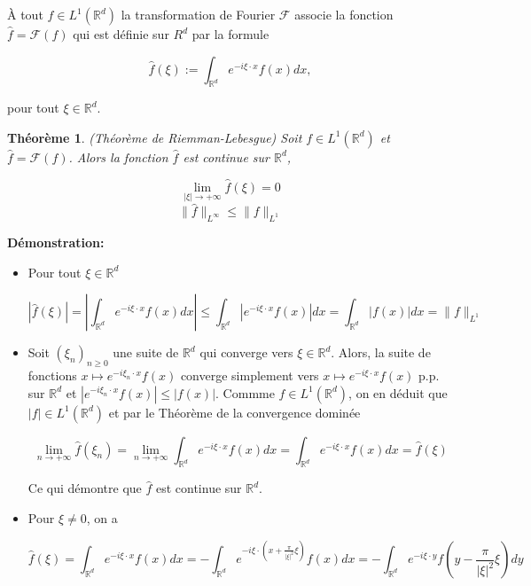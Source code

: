 \documentclass[10pt,a4paper,oneside]{article}
\newtheorem{theoreme}{Théorème}
\newenvironment{definition}[1][Definition]{\begin{trivlist}
\item[\hskip \labelsep {\bfseries #1}]}{\end{trivlist}}
\begin{document}
\begin{itemize}

\item
\begin{definition}
À tout $f \in L^1(\mathbb{R}^d)$ la transformation de Fourier $\mathcal{F}$ associe la fonction $\hat{f} = \mathcal{F}(f)$ qui est définie sur $R^d$ par la formule

\[ \hat{f}(\xi) := \int_{\mathbb{R}^d} e^{-i \xi \cdot x} f(x) dx, \]

pour tout $\xi \in \mathbb{R}^d$.
\end{definition}

\item
\begin{theoreme}
(Théorème de Riemman-Lebesgue)
Soit $f \in L^1(\mathbb{R}^d)$ et $\hat{f} = \mathcal{F}(f)$. Alors la fonction $\hat{f}$ est continue sur $\mathbb{R}^d$,

\[ \lim_{|\xi| \to +\infty} \hat{f}(\xi) = 0 \]
\[ \| \hat{f} \|_{L^\infty} \leq \| f \|_{L^1} \]
\end{theoreme}

\textbf{Démonstration:}

\begin{itemize}
\item
Pour tout $\xi \in \mathbb{R}^d$

\[ |\hat{f}(\xi)| = |\int_{\mathbb{R}^d} e^{-i \xi \cdot x} f(x) dx| \leq  \int_{\mathbb{R}^d} |e^{-i \xi \cdot x} f(x)| dx = \int_{\mathbb{R}^d} |f(x)|dx = \| f \|_{L^1} \]

\item
Soit $(\xi_n)_{n \geq 0}$ une suite de $\mathbb{R}^d$ qui converge vers $\xi \in \mathbb{R}^d$. Alors, la suite de fonctions $x \mapsto e^{-i \xi_n \cdot x}f(x)$ converge simplement vers $x \mapsto e^{-i \xi \cdot x} f(x)$ p.p. sur $\mathbb{R}^d$ et $|e^{-i \xi_n \cdot x} f(x)| \leq |f(x)|$. Commme $f \in L^1(\mathbb{R}^d)$, on en déduit que $|f| \in L^1(\mathbb{R}^d)$ et par le Théorème de la convergence dominée

\[ \lim_{n \to +\infty} \hat{f}(\xi_n) = \lim_{n \to +\infty} \int_{\mathbb{R}^d} e^{-i \xi \cdot x} f(x) dx = \int_{\mathbb{R}^d} e^{-i \xi \cdot x} f(x) dx = \hat{f}(\xi) \]

Ce qui démontre que $\hat{f}$ est continue sur $\mathbb{R}^d$.

\item
Pour $\xi \neq 0$, on a

\[ \hat{f}(\xi) = \int_{\mathbb{R}^d} e^{-i \xi \cdot x} f(x) dx = -\int_{\mathbb{R}^d} e^{-i \xi \cdot (x + \frac{\pi}{|\xi|^2}\xi)} f(x) dx = -\int_{\mathbb{R}^d} e^{-i \xi \cdot y} f(y - \frac{\pi}{|\xi|^2}\xi) dy \]


\end{itemize}
\end{itemize}
\end{document}
